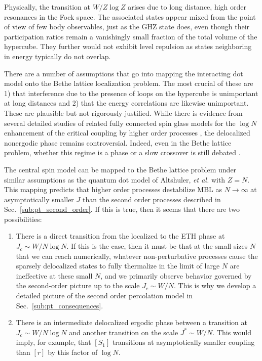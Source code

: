 \documentclass[aps,pra,twocolumn,a4paper,showpacs,superscriptaddress,floatfix,10pt]{revtex4}
\begin{document}
Physically, the transition at $W/Z\log Z$ arises due to long distance, high order resonances in the Fock space.
The associated states appear mixed from the point of view of few body observables, just as the GHZ state does, even though their participation ratios remain a vanishingly small fraction of the total volume of the hypercube.
They further would not exhibit level repulsion as states neighboring in energy typically do not overlap.

There are a number of assumptions that go into mapping the interacting dot model onto the Bethe lattice localization problem.
The most crucial of these are 1) that interference due to the presence of loops on the hypercube is unimportant at long distances and 2) that the energy correlations are likewise unimportant.
These are plausible but not rigorously justified.
While there is evidence from several detailed studies of related fully connected spin glass models for the $\log N$ enhancement of the critical coupling by higher order processes \cite{Burin:2016aa,Baldwin:2017aa,Laumann:2014aa}, the delocalized nonergodic phase remains controversial.
Indeed, even in the Bethe lattice problem, whether this regime is a phase or a slow crossover is still debated \cite{Biroli:2012vk,DeLuca:2014ch,Altshuler:2016aa}.

The central spin model can be mapped to the Bethe lattice problem under similar assumptions as the quantum dot model of Altshuler, {\it et al.} with $Z = N$.
This mapping predicts that higher order processes destabilize MBL as $N \to \infty$ at asymptotically smaller $J$ than the second order processes described in Sec.~\ref{sub:pt_second_order}.
If this is true, then it seems that there are two possibilities:
\begin{enumerate}
	\item There is a direct transition from the localized to the ETH phase at $J_c \sim W / N \log N$.  If this is the case, then it must be that at the small sizes $N$ that we can reach numerically, whatever non-perturbative processes cause the sparsely delocalized states to fully thermalize in the limit of large $N$ are ineffective at these small $N$, and we primarily observe behavior governed by the second-order picture up to the scale $J_c \sim W/N$.  This is why we develop a detailed picture of the second order percolation model in Sec.~\ref{sub:pt_consequences}.

	\item There is an intermediate delocalized ergodic phase between a transition at $J_c \sim W/ N \log N$ and another transition on the scale $J^* \sim W/N$. This would imply, for example, that $[S_1]$ transitions at asymptotically smaller coupling than $[r]$ by this factor of $\log N$.
\end{enumerate}
\end{document}
